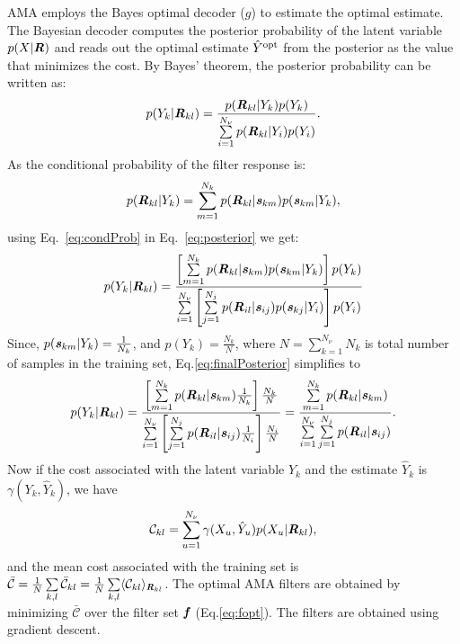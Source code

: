 \documentclass{jov}
\begin{document}
AMA employs the Bayes optimal decoder ($g$) to estimate the optimal estimate. The Bayesian decoder computes the posterior probability of the latent variable $p(X|{\textbf {\textit R}})$ and reads out the optimal estimate $\hat{Y}^{\rm opt}$ from the posterior as the value that minimizes the cost. By Bayes' theorem, the posterior probability can be written as:
\begin{align}
p(Y_k|{\textbf {\textit R} }_{kl}) = \frac{p({\textbf {\textit R} }_{kl}|Y_k)p(Y_k)}{\sum\limits_{i=1}^{N_{\nu}}{p({\textbf {\textit R} }_{kl}|Y_i)p(Y_i)}}.
\label{eq:posterior}
\end{align}
As the conditional probability of the filter response is:
\begin{align}
p({\textbf {\textit R} }_{kl}|Y_k) = \sum\limits_{m=1}^{N_k}p({\textbf {\textit R} }_{kl}|{\textbf {\textit s} }_{km})p({\textbf {\textit s} }_{km}|Y_k),
\label{eq:condProb}
\end{align}
using Eq.~\ref{eq:condProb} in Eq.~\ref{eq:posterior} we get:
\begin{align}
p(Y_k|{\textbf {\textit R} }_{kl}) = \frac{\left[\sum\limits_{m=1}^{N_k}p({\textbf {\textit R} }_{kl}|{\textbf {\textit s} }_{km})p({\textbf {\textit s} }_{km}|Y_k)\right]p(Y_k)}{\sum\limits_{i=1}^{N_{\nu}}{\left[\sum\limits_{j=1}^{N_j}p({\textbf {\textit R} }_{il}|{\textbf {\textit s} }_{ij})p({\textbf {\textit s} }_{kj}|Y_i)\right]p(Y_i)}}
\label{eq:finalPosterior}
\end{align}
Since, $p({\textbf {\textit s} }_{km}|Y_k) = \frac{1}{N_k}$, and $p(Y_k)=\frac{N_k}{N}$, where $N = \sum\limits_{k=1}^{N_{\nu}}N_{k}$ is total number of samples in the training set, Eq.\ref{eq:finalPosterior} simplifies to
\begin{align}
p(Y_k|{\textbf {\textit R} }_{kl}) = \frac{\left[\sum\limits_{m=1}^{N_k}p({\textbf {\textit R} }_{kl}|{\textbf {\textit s} }_{km}) \frac{1}{N_k}\right]\frac{N_k}{N}}{\sum\limits_{i=1}^{N_{\nu}}{\left[\sum\limits_{j=1}^{N_j}p({\textbf {\textit R} }_{il}|{\textbf {\textit s} }_{ij}) \frac{1}{N_i}\right]\frac{N_i}{N}}} = \frac{\sum\limits_{m=1}^{N_k}p({\textbf {\textit R} }_{kl}|{\textbf {\textit s} }_{km})}{\sum\limits_{i=1}^{N_{\nu}}{\sum\limits_{j=1}^{N_j}p({\textbf {\textit R} }_{il}|{\textbf {\textit s} }_{ij})}}.
\label{eq:simplifiedPosterior}
\end{align}
Now if the cost associated with the latent variable $Y_k$ and the estimate $\hat{Y}_k$ is $\gamma (Y_k,\hat{Y}_k)$, we have  
\begin{align}
\mathcal{C}_{kl} = \sum\limits_{u=1}^{N_{\nu}}\gamma(X_u,\hat{Y}_u)p(X_u|{\textbf{\textit R}}_{kl}),
\end{align}
and the mean cost associated with the training set is $\bar{\mathcal{C}} = \frac{1}{N} \sum\limits_{k,l}\bar{\mathcal{C}}_{kl} = \frac{1}{N} \sum\limits_{k,l}\langle \mathcal{C}_{kl}\rangle_{{\textbf{\textit R}}_{kl}}$. The optimal AMA filters are obtained by minimizing $\bar{\mathcal{C}}$ over the filter set ${\textbf {\textit f} }$ (Eq.\ref{eq:fopt}). The filters are obtained using gradient descent.
\end{document}

